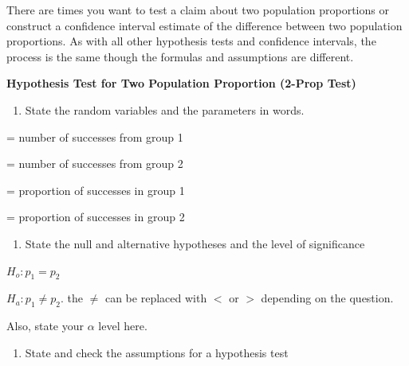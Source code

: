 \documentclass[
]{book}
\providecommand{\tightlist}{%
  \setlength{\itemsep}{0pt}\setlength{\parskip}{0pt}}
\begin{document}
There are times you want to test a claim about two population proportions or construct a confidence interval estimate of the difference between two population proportions. As with all other hypothesis tests and confidence intervals, the process is the same though the formulas and assumptions are different.

\textbf{Hypothesis Test for Two Population Proportion (2-Prop Test)}

\begin{enumerate}
\def\labelenumi{\arabic{enumi}.}
\tightlist
\item
  State the random variables and the parameters in words.
\end{enumerate}

= number of successes from group 1

= number of successes from group 2

= proportion of successes in group 1

= proportion of successes in group 2

\begin{enumerate}
\def\labelenumi{\arabic{enumi}.}
\setcounter{enumi}{1}
\tightlist
\item
  State the null and alternative hypotheses and the level of significance
\end{enumerate}

\(H_o:p_1=p_2\)

\(H_a: p_1\ne p_2\). the \(\ne\) can be replaced with \(<\) or \(>\) depending on the question.

Also, state your \(\alpha\) level here.

\begin{enumerate}
\def\labelenumi{\arabic{enumi}.}
\setcounter{enumi}{2}
\tightlist
\item
  State and check the assumptions for a hypothesis test
\end{enumerate}
\end{document}
